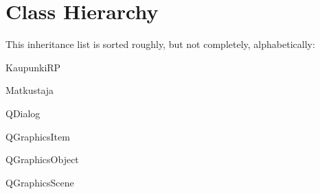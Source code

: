 \section{Class Hierarchy}
This inheritance list is sorted roughly, but not completely, alphabetically\-:\begin{DoxyCompactList}
\item Kaupunki\-R\-P\begin{DoxyCompactList}
\item {}
\end{DoxyCompactList}
\item Matkustaja\begin{DoxyCompactList}
\item {}
\end{DoxyCompactList}
\item Q\-Dialog\begin{DoxyCompactList}
\item {}
\end{DoxyCompactList}
\item Q\-Graphics\-Item\begin{DoxyCompactList}
\item {}
\end{DoxyCompactList}
\item Q\-Graphics\-Object\begin{DoxyCompactList}
\item {}
\begin{DoxyCompactList}
\item {}
\item {}
\item {}
\end{DoxyCompactList}
\item {}
\end{DoxyCompactList}
\item Q\-Graphics\-Scene\begin{DoxyCompactList}
\item {}

\end{DoxyCompactList}
\end{DoxyCompactList}
